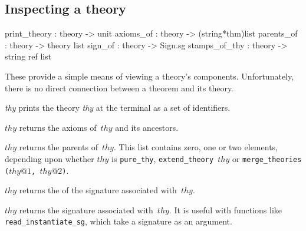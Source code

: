 \subsection{Inspecting a theory}
\begin{ttbox} 
print_theory  : theory -> unit
axioms_of     : theory -> (string*thm)list
parents_of    : theory -> theory list
sign_of       : theory -> Sign.sg
stamps_of_thy : theory -> string ref list
\end{ttbox}
These provide a simple means of viewing a theory's components.
Unfortunately, there is no direct connection between a theorem and its
theory.
\begin{ttdescription}
\item[\ttindexbold{print_theory} {\it thy}]  
prints the theory {\it thy\/} at the terminal as a set of identifiers.

\item[\ttindexbold{axioms_of} $thy$] 
returns the axioms of~$thy$ and its ancestors.

\item[\ttindexbold{parents_of} $thy$] 
returns the parents of~$thy$.  This list contains zero, one or two
elements, depending upon whether $thy$ is {\tt pure_thy}, 
\hbox{\tt extend_theory $thy$} or \hbox{\tt merge_theories ($thy@1$, $thy@2$)}.

\item[\ttindexbold{stamps_of_thy} $thy$]
returns the  of the signature associated with~$thy$.

\item[\ttindexbold{sign_of} $thy$] 
returns the signature associated with~$thy$.  It is useful with functions
like {\tt read_instantiate_sg}, which take a signature as an argument.
\end{ttdescription}


